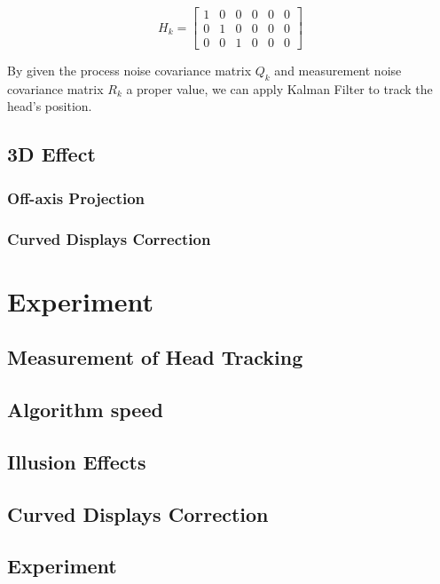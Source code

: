 \begin {equation}
    H_k = \begin{bmatrix} 1 & 0 & 0 & 0 & 0 & 0 \\ 0 & 1 & 0 & 0 & 0 & 0 \\ 0 & 0 & 1 & 0 & 0 & 0 \end{bmatrix}
\end {equation}

By given the process noise covariance matrix $Q_k$ and measurement noise covariance matrix $R_k$ a proper value, we can apply Kalman Filter to track the head's position.

\subsection{3D Effect}
\subsubsection{Off-axis Projection}

\subsubsection{Curved Displays Correction}



\section {Experiment}

\subsection{Measurement of Head Tracking}
\subsection{Algorithm speed}
\subsection{Illusion Effects}


\subsection{Curved Displays Correction}

\subsection {Experiment}


